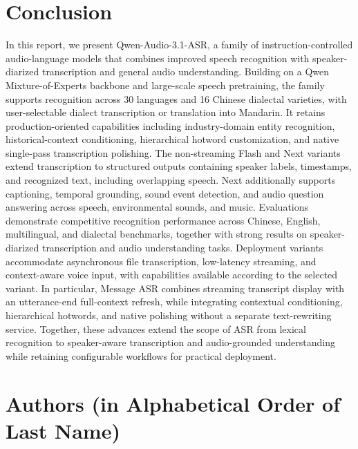 \documentclass{article}
\begin{document}
%

%
%
%


%
%

%

%
%


%

%

%

%
%
%
%
%
%

%

\section{Conclusion}
In this report, we present Qwen-Audio-3.1-ASR, a family of instruction-controlled audio-language models that combines improved speech recognition with speaker-diarized transcription and general audio understanding. Building on a Qwen Mixture-of-Experts backbone and large-scale speech pretraining, the family supports recognition across 30 languages and 16 Chinese dialectal varieties, with user-selectable dialect transcription or translation into Mandarin. It retains production-oriented capabilities including industry-domain entity recognition, historical-context conditioning, hierarchical hotword customization, and native single-pass transcription polishing. The non-streaming Flash and Next variants extend transcription to structured outputs containing speaker labels, timestamps, and recognized text, including overlapping speech. Next additionally supports captioning, temporal grounding, sound event detection, and audio question answering across speech, environmental sounds, and music. Evaluations demonstrate competitive recognition performance across Chinese, English, multilingual, and dialectal benchmarks, together with strong results on speaker-diarized transcription and audio understanding tasks. Deployment variants accommodate asynchronous file transcription, low-latency streaming, and context-aware voice input, with capabilities available according to the selected variant. In particular, Message ASR combines streaming transcript display with an utterance-end full-context refresh, while integrating contextual conditioning, hierarchical hotwords, and native polishing without a separate text-rewriting service. Together, these advances extend the scope of ASR from lexical recognition to speaker-aware transcription and audio-grounded understanding while retaining configurable workflows for practical deployment.

\section{Authors (in Alphabetical Order of Last Name)}
\end{document}
